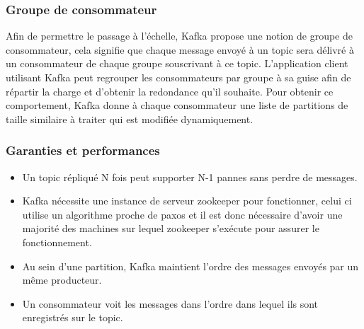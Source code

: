 \documentclass[a4paper, 11pt, titlepage]{article}
\begin{document}
\subsubsection* {Groupe de consommateur}

Afin de permettre le passage à l'échelle, Kafka propose une notion de groupe de consommateur, cela signifie que chaque message envoyé à un topic sera délivré à un consommateur de chaque groupe souscrivant à ce topic. L'application client utilisant Kafka peut regrouper les consommateurs par groupe à sa guise afin de répartir la charge et d'obtenir la redondance qu'il souhaite. Pour obtenir ce comportement, Kafka donne à chaque consommateur une liste de partitions de taille similaire à traiter qui est modifiée dynamiquement.



\subsubsection* {Garanties et performances}


\begin{itemize}

\item
Un topic répliqué N fois peut supporter N-1 pannes sans perdre de messages.

\item
Kafka nécessite une instance de serveur zookeeper pour fonctionner, celui ci utilise un algorithme proche de paxos et il est donc nécessaire d'avoir une majorité des machines sur lequel zookeeper s'exécute pour assurer le fonctionnement.

\item
Au sein d'une partition, Kafka maintient l'ordre des messages envoyés par un même producteur.

\item
Un consommateur voit les messages dans l'ordre dans lequel ils sont enregistrés sur le topic.

\end{itemize}



\end{document}
